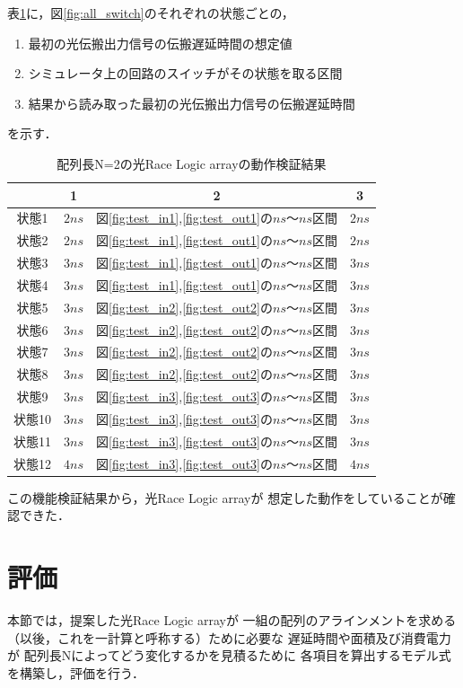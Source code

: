 表\ref{test_timing}に，図\ref{fig:all_switch}のそれぞれの状態ごとの，
\begin{enumerate}
\item 最初の光伝搬出力信号の伝搬遅延時間の想定値
\item シミュレータ上の回路のスイッチがその状態を取る区間
\item 結果から読み取った最初の光伝搬出力信号の伝搬遅延時間
\end{enumerate}
を示す．
\begin{table}[t!]
\begin{center}
\caption{配列長N=2の光Race Logic arrayの動作検証結果}
\begin{tabular}{|c|c|c|c|} \hline
&1&2&3\\ \hline \hline
状態1&$2ns$&図\ref{fig:test_in1},\ref{fig:test_out1}の$ns〜ns区間$&$2ns$\\ \hline
状態2&$2ns$&図\ref{fig:test_in1},\ref{fig:test_out1}の$ns〜ns区間$&$2ns$\\ \hline
状態3&$3ns$&図\ref{fig:test_in1},\ref{fig:test_out1}の$ns〜ns区間$&$3ns$\\ \hline
状態4&$3ns$&図\ref{fig:test_in1},\ref{fig:test_out1}の$ns〜ns区間$&$3ns$\\ \hline
状態5&$3ns$&図\ref{fig:test_in2},\ref{fig:test_out2}の$ns〜ns区間$&$3ns$\\ \hline
状態6&$3ns$&図\ref{fig:test_in2},\ref{fig:test_out2}の$ns〜ns区間$&$3ns$\\ \hline
状態7&$3ns$&図\ref{fig:test_in2},\ref{fig:test_out2}の$ns〜ns区間$&$3ns$\\ \hline
状態8&$3ns$&図\ref{fig:test_in2},\ref{fig:test_out2}の$ns〜ns区間$&$3ns$\\ \hline
状態9&$3ns$&図\ref{fig:test_in3},\ref{fig:test_out3}の$ns〜ns区間$&$3ns$\\ \hline
状態10&$3ns$&図\ref{fig:test_in3},\ref{fig:test_out3}の$ns〜ns区間$&$3ns$\\ \hline
状態11&$3ns$&図\ref{fig:test_in3},\ref{fig:test_out3}の$ns〜ns区間$&$3ns$\\ \hline
状態12&$4ns$&図\ref{fig:test_in3},\ref{fig:test_out3}の$ns〜ns区間$&$4ns$\\ \hline
\end{tabular}
\label{test_timing}
\end{center}
\end{table}

この機能検証結果から，光Race Logic arrayが
想定した動作をしていることが確認できた．

\section{評価}
本節では，提案した光Race Logic arrayが
一組の配列のアラインメントを求める（以後，これを一計算と呼称する）ために必要な
遅延時間や面積及び消費電力が
配列長Nによってどう変化するかを見積るために
各項目を算出するモデル式を構築し，評価を行う．

